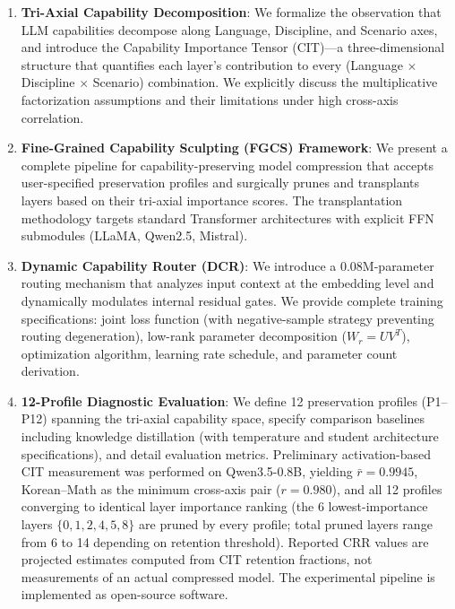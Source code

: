 \documentclass[twocolumn]{article}
\begin{document}
\begin{enumerate}[leftmargin=*]
\item \textbf{Tri-Axial Capability Decomposition}: We formalize the observation that LLM capabilities decompose along Language, Discipline, and Scenario axes, and introduce the Capability Importance Tensor (CIT)---a three-dimensional structure that quantifies each layer's contribution to every (Language $\times$ Discipline $\times$ Scenario) combination. We explicitly discuss the multiplicative factorization assumptions and their limitations under high cross-axis correlation.

\item \textbf{Fine-Grained Capability Sculpting (FGCS) Framework}: We present a complete pipeline for capability-preserving model compression that accepts user-specified preservation profiles and surgically prunes and transplants layers based on their tri-axial importance scores. The transplantation methodology targets standard Transformer architectures with explicit FFN submodules (LLaMA, Qwen2.5, Mistral).

\item \textbf{Dynamic Capability Router (DCR)}: We introduce a 0.08M-parameter routing mechanism that analyzes input context at the embedding level and dynamically modulates internal residual gates. We provide complete training specifications: joint loss function (with negative-sample strategy preventing routing degeneration), low-rank parameter decomposition ($W_r = U V^T$), optimization algorithm, learning rate schedule, and parameter count derivation.

\item \textbf{12-Profile Diagnostic Evaluation}: We define 12 preservation profiles (P1--P12) spanning the tri-axial capability space, specify comparison baselines including knowledge distillation (with temperature and student architecture specifications), and detail evaluation metrics. Preliminary activation-based CIT measurement was performed on Qwen3.5-0.8B, yielding $\bar{r} = 0.9945$, Korean--Math as the minimum cross-axis pair ($r = 0.980$), and all 12 profiles converging to identical layer importance ranking (the 6 lowest-importance layers $\{0,1,2,4,5,8\}$ are pruned by every profile; total pruned layers range from 6 to 14 depending on retention threshold). Reported CRR values are projected estimates computed from CIT retention fractions, not measurements of an actual compressed model. The experimental pipeline is implemented as open-source software.
\end{enumerate}
\end{document}
